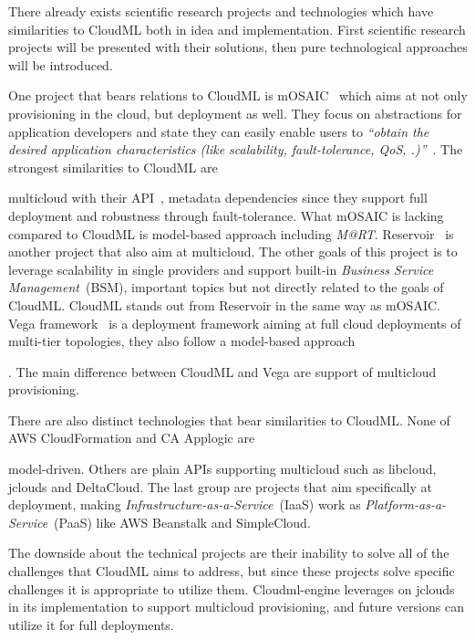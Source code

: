 
There already exists scientific research projects and technologies
which have similarities to CloudML both in idea and implementation. 
First scientific research projects will be presented with their solutions, 
then pure technological approaches will be introduced.

One project that bears relations to CloudML is mOSAIC~\cite{portable:petcu12} which
aims at not only provisioning in the cloud, but deployment as well.
They focus on abstractions for application developers and state they can easily enable users to
\emph{``obtain the desired application characteristics (like
scalability, fault-tolerance, QoS, \etc.)''}~\cite{architecturing:petcu11}.
The strongest similarities to CloudML are 
\begin{ii}\iitem multicloud with their API~\cite{architecturing:petcu11},
\iitem metadata dependencies since they support full deployment and
\iitem robustness through fault-tolerance.
What mOSAIC is lacking compared to CloudML is model-based approach including \emph{M@RT}.
Reservoir~\cite{reservoir:rochweger09} is another project that also aim at
\iitem multicloud. The other goals of this project is to leverage 
scalability in single providers and support built-in \emph{Business Service Management}~(BSM),
important topics but not directly related to the goals of CloudML.
CloudML stands out from Reservoir in the same way as mOSAIC.
Vega framework~\cite{simplifying:chieu10} is a deployment framework aiming 
at full cloud deployments of multi-tier topologies, they also follow a \iitem model-based 
approach\end{ii}. The main difference between CloudML and Vega are support of multicloud provisioning.

There are also distinct technologies that bear similarities to CloudML.
None of AWS CloudFormation and CA Applogic are \begin{ii}\iitem model-driven.
Others are plain APIs supporting \iitem multicloud such as libcloud, jclouds and DeltaCloud.
The last group are projects that aim specifically at deployment, 
making \emph{Infrastructure-as-a-Service}~(IaaS) work as \emph{Platform-as-a-Service}~(PaaS)
like AWS Beanstalk and SimpleCloud.\end{ii}
The downside about the technical projects are their inability to solve all of the challenges
that CloudML aims to address, but since these projects solve specific
challenges it is appropriate to utilize them.
Cloudml-engine leverages on jclouds in its implementation to support multicloud provisioning,
and future versions can utilize it for full deployments.
